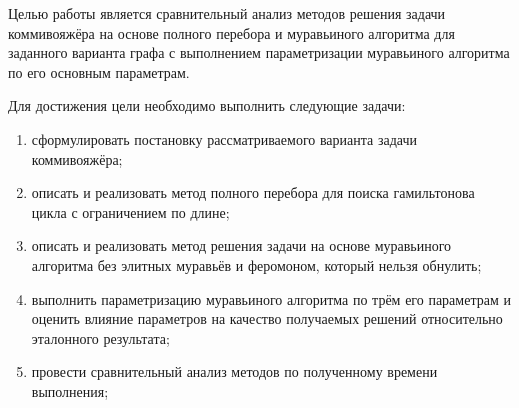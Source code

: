 

Целью работы является сравнительный анализ методов решения задачи коммивояжёра на основе полного перебора и муравьиного алгоритма для заданного варианта графа с выполнением параметризации муравьиного алгоритма по его основным параметрам.

Для достижения цели необходимо выполнить следующие задачи:
\begin{enumerate}
	\item сформулировать постановку рассматриваемого варианта задачи коммивояжёра;
	\item описать и реализовать метод полного перебора для поиска гамильтонова цикла с ограничением по длине;
	\item описать и реализовать метод решения задачи на основе муравьиного алгоритма без элитных муравьёв и феромоном, который нельзя обнулить;
	\item выполнить параметризацию муравьиного алгоритма по трём его параметрам и оценить влияние параметров на качество получаемых решений относительно эталонного результата;
	\item провести сравнительный анализ методов по полученному времени выполнения;

\end{enumerate}

